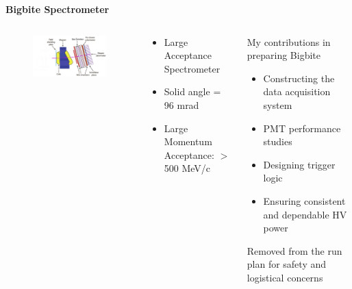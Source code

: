 \documentclass[12pt,usenames,dvipsnames]{beamer}
\begin{document}
\begin{frame}
\centering 
\textbf{Bigbite Spectrometer}
\begin{columns}
	
	\begin{figure}
		\hspace*{-1.4cm}	\includegraphics[width=7cm]{../images/Thesis/BigBite1.png}
	\end{figure}
	\begin{block}{}
		\begin{itemize}
			\item[] \noindent Large Acceptance Spectrometer
			\item Solid angle = 96 mrad
			\item Large Momentum Acceptance: $>$ 500 MeV/c
		\end{itemize}
	\end{block}
	
	\hspace*{0.5cm}
	\begin{block}{My contributions in preparing Bigbite}
		\begin{itemize}
			\item Constructing the data acquisition system
			\item PMT performance studies
			\item Designing trigger logic
			\item Ensuring consistent and dependable HV power
		\end{itemize}
		Removed from the run plan for safety and logistical concerns
	\end{block}
\end{columns}
\end{frame}

\end{document}
